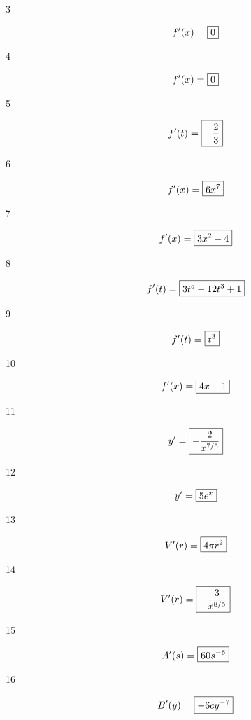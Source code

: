 \documentclass[letterpaper]{exam}
\begin{document}
  \begin{description}

    \item[3] 
      \[
        f'(x) = \boxed{ 0 } \\
      \]

    \item[4] 
      \[
        f'(x) = \boxed{ 0 } \\
      \]

    \item[5] 
      \[
        f'(t) = \boxed{ - \frac{2}{3} } \\
      \]

    \item[6] 
      \[
        f'(x) = \boxed{ 6 x^7 } \\
      \]

    \item[7] 
      \[
        f'(x) = \boxed{ 3x^2 - 4 } \\
      \]

    \item[8] 
      \[
        f'(t) = \boxed{ 3t^5 - 12t^3 + 1 } \\
      \]

    \item[9] 
      \[
        f'(t) = \boxed{ t^3 } \\
      \]

    \item[10] 
      \[
        f'(x) = \boxed{ 4x - 1 } \\
      \]

    \item[11] 
      \[
        y' = \boxed{ -\frac{2}{x^{7/5}} } \\
      \]

    \item[12] 
      \[
        y' = \boxed{ 5e^x } \\
      \]

    \item[13] 
      \[
        V'(r) = \boxed{ 4 \pi r^2 } \\
      \]

    \item[14] 
      \[
        V'(r) = \boxed{ -\frac{3}{x^{8/5}} } \\
      \]

    \item[15] 
      \[
        A'(s) = \boxed{ 60 s^{-6} } \\
      \]

    \item[16] 
      \[
        B'(y) = \boxed{ -6 c y^{-7} } \\
      \]


\end{description}
\end{document}
